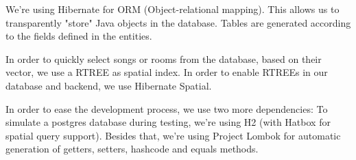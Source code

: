 We're using Hibernate for ORM (Object-relational mapping).
This allows us to transparently "store" Java objects in the database.
Tables are generated according to the fields defined in the entities.

In order to quickly select songs or rooms from the database, based on their vector, we use a RTREE as spatial index.
In order to enable RTREEs in our database and backend, we use Hibernate Spatial.

In order to ease the development process, we use two more dependencies:
To simulate a postgres database during testing, we're using H2 (with Hatbox for spatial query support).
Besides that, we're using Project Lombok for automatic generation of getters, setters, hashcode and equals methods.
